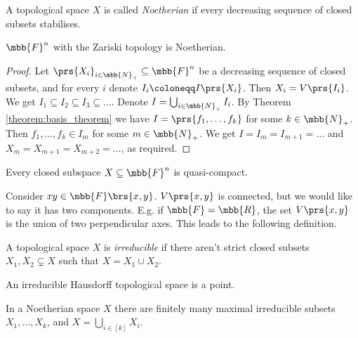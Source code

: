 \documentclass[10pt,a4paper,twoside,openany,hidelinks]{book}
\begin{document}
\begin{definition}
A topological space $X$ is called \emph{Noetherian} if every decreasing sequence of closed subsets stabilises.
\end{definition}

\begin{corollary}
$\mbb{F}^n$ with the Zariski topology is Noetherian.
\end{corollary}

\begin{proof}
Let $\prs{X_i}_{i \in \mbb{N}_+} \subseteq \mbb{F}^n$ be a decreasing sequence of closed subsets, and for every $i$ denote $I_i \coloneqq I\prs{X_i}$. Then $X_i = V\prs{I_i}$. We get $I_1 \subseteq I_2 \subseteq I_3 \subseteq \ldots$. Denote $I = \bigcup_{i \in \mbb{N}_+} I_i$.  By Theorem \ref{theorem:basis_theorem} we have $I = \prs{f_1, \ldots, f_k}$ for some $k \in \mbb{N}_+$. Then $f_1, \ldots, f_k \in I_m$ for some $m \in \mbb{N}_+$. We get $I = I_m = I_{m+1} = \ldots$ and $X_m = X_{m+1} = X_{m+2} = \ldots$, as required.
\end{proof}

\begin{exercise}
Every closed subspace $X \subseteq \mbb{F}^n$ is quasi-compact.
\end{exercise}

\begin{example}
Consider $xy \in \mbb{F}\brs{x,y}$. $V\prs{x,y}$ is connected, but we would like to say it has two components. E.g. if $\mbb{F} = \mbb{R}$, the set $V\prs{x,y}$ is the union of two perpendicular axes. This leads to the following definition.
\end{example}

\begin{definition}
A topological space $X$ is \emph{irreducible} if there aren't strict closed subsets $X_1, X_2 \subsetneq X$ such that $X = X_1 \cup X_2$.
\end{definition}

\begin{exercise}
An irreducible Hausdorff topological space is a point.
\end{exercise}

\begin{exercise}
In a Noetherian space $X$ there are finitely many maximal irreducible subsets $X_1, \ldots, X_k$, and $X = \bigcup_{i \in [k]} X_i$.
\end{exercise}
\end{document}
